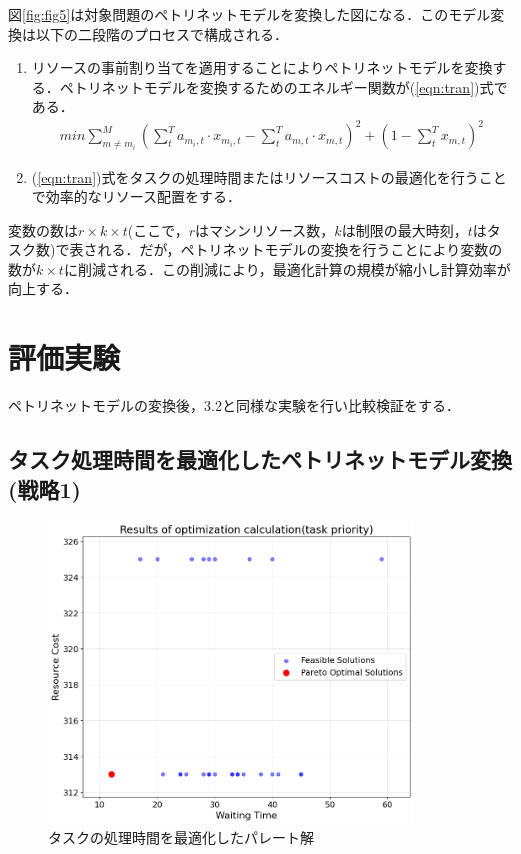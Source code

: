 図\ref{fig:fig5}は対象問題のペトリネットモデルを変換した図になる．このモデル変換は以下の二段階のプロセスで構成される．

\begin{enumerate} 
\item リソースの事前割り当てを適用することによりペトリネットモデルを変換する．ペトリネットモデルを変換するためのエネルギー関数が(\ref{eqn:tran})式である．
\begin{align} 
min \sum_{m \ne m_i}^M \left( \sum_t^T a_{m_i,t} \cdot x_{m_i,t} - \sum_t^T a_{m,t} \cdot x_{m,t}\right)^2 + \left(1 - \sum_t^T x_{m,t} \right)^2 \label{eqn:tran} 
\end{align}

\item (\ref{eqn:tran})式をタスクの処理時間またはリソースコストの最適化を行うことで効率的なリソース配置をする．
\end{enumerate}

変数の数は$r \times k \times t$(ここで，$r$はマシンリソース数，$k$は制限の最大時刻，$t$はタスク数)で表される．だが，ペトリネットモデルの変換を行うことにより変数の数が$k \times t$に削減される．この削減により，最適化計算の規模が縮小し計算効率が向上する．

\section{評価実験}
ペトリネットモデルの変換後，3.2と同様な実験を行い比較検証をする．

\subsection{タスク処理時間を最適化したペトリネットモデル変換(戦略1)}

\begin{figure}[H]
    \centering
    \includegraphics[width=0.8\linewidth, height=8cm]{./images/task_job5.png}
    \caption{タスクの処理時間を最適化したパレート解}
    \label{fig:fig6}
\end{figure}

